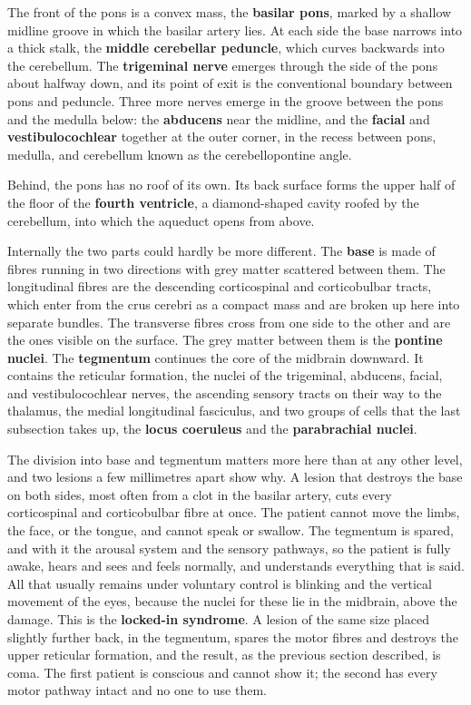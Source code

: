\documentclass[11pt]{article}
\begin{document}
The front of the pons is a convex mass, the \textbf{basilar pons}, marked by a shallow midline groove in which the basilar artery lies. At each side the base narrows into a thick stalk, the \textbf{middle cerebellar peduncle}, which curves backwards into the cerebellum. The \textbf{trigeminal nerve} emerges through the side of the pons about halfway down, and its point of exit is the conventional boundary between pons and peduncle. Three more nerves emerge in the groove between the pons and the medulla below: the \textbf{abducens} near the midline, and the \textbf{facial} and \textbf{vestibulocochlear} together at the outer corner, in the recess between pons, medulla, and cerebellum known as the cerebellopontine angle.

Behind, the pons has no roof of its own. Its back surface forms the upper half of the floor of the \textbf{fourth ventricle}, a diamond-shaped cavity roofed by the cerebellum, into which the aqueduct opens from above.

Internally the two parts could hardly be more different. The \textbf{base} is made of fibres running in two directions with grey matter scattered between them. The longitudinal fibres are the descending corticospinal and corticobulbar tracts, which enter from the crus cerebri as a compact mass and are broken up here into separate bundles. The transverse fibres cross from one side to the other and are the ones visible on the surface. The grey matter between them is the \textbf{pontine nuclei}. The \textbf{tegmentum} continues the core of the midbrain downward. It contains the reticular formation, the nuclei of the trigeminal, abducens, facial, and vestibulocochlear nerves, the ascending sensory tracts on their way to the thalamus, the medial longitudinal fasciculus, and two groups of cells that the last subsection takes up, the \textbf{locus coeruleus} and the \textbf{parabrachial nuclei}.

The division into base and tegmentum matters more here than at any other level, and two lesions a few millimetres apart show why. A lesion that destroys the base on both sides, most often from a clot in the basilar artery, cuts every corticospinal and corticobulbar fibre at once. The patient cannot move the limbs, the face, or the tongue, and cannot speak or swallow. The tegmentum is spared, and with it the arousal system and the sensory pathways, so the patient is fully awake, hears and sees and feels normally, and understands everything that is said. All that usually remains under voluntary control is blinking and the vertical movement of the eyes, because the nuclei for these lie in the midbrain, above the damage. This is the \textbf{locked-in syndrome}. A lesion of the same size placed slightly further back, in the tegmentum, spares the motor fibres and destroys the upper reticular formation, and the result, as the previous section described, is coma. The first patient is conscious and cannot show it; the second has every motor pathway intact and no one to use them.
\end{document}
